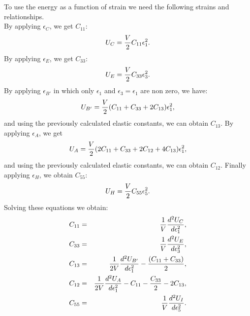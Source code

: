 \documentclass[12pt,a4paper]{article}
\begin{document}
To use the energy as a function of strain 
we need the following strains and relationships. \\
By applying $\epsilon_C$, we get $C_{11}$:
\begin{equation}
U_C= {V \over 2} C_{11} \epsilon_1^2.
\end{equation}
By applying $\epsilon_E$, we get $C_{33}$:
\begin{equation}
U_E= {V \over 2} C_{33} \epsilon_3^2.
\end{equation}
By applying $\epsilon_{B'}$ in which only $\epsilon_1$ and 
$\epsilon_3=\epsilon_1$ are non zero, we have:
\begin{equation}
U_{B'}= {V \over 2} (C_{11} + C_{33} + 2 C_{13}) \epsilon_1^2,
\end{equation}
and using the previously calculated elastic constants, we can obtain $C_{13}$.
By applying $\epsilon_A$, we get
\begin{equation}
U_A= {V \over 2} (2C_{11} + C_{33} + 2 C_{12} + 4 C_{13}) \epsilon_1^2,
\end{equation}
and using the previously calculated elastic constants, we can obtain $C_{12}$.
Finally applying $\epsilon_H$, we obtain $C_{55}$:
\begin{equation}
U_H= {V \over 2} C_{55} \epsilon_5^2.
\end{equation}
Solving these equations we obtain:
\begin{eqnarray}
C_{11}&=&{1 \over V} {d^2 U_C \over d \epsilon_1^2}, \\ 
C_{33}&=&{1 \over V} {d^2 U_E \over d \epsilon_3^2}, \\ 
C_{13}&=&{1 \over 2 V} {d^2 U_{B'} \over d \epsilon_1^2} - 
{(C_{11} + C_{33})\over 2}, \\
C_{12}&=&{1 \over 2 V} {d^2 U_A \over d \epsilon_1^2} - C_{11} - 
{C_{33} \over 2} - 2 C_{13}, \\
C_{55}&=&{1 \over V} {d^2 U_I \over d \epsilon_5^2}. \\
\end{eqnarray}
\end{document}
